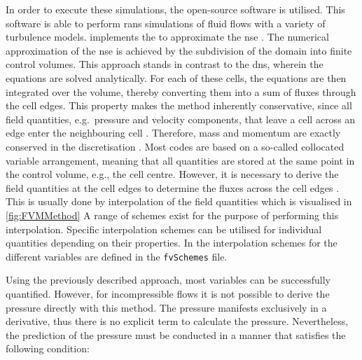In order to execute these simulations, the open-source software  is utilised. 
This software is able to perform \acrshort{rans} simulations of fluid flows with a variety of turbulence models. 
 implements the  to approximate the \acrshort{nse} \citep{weller_tensorial_1998}.
The numerical approximation of the \acrshort{nse} is achieved by the subdivision of the domain into finite control volumes. 
This approach stands in contrast to the \acrshort{dns}, wherein the equations are solved analytically.
For each of these cells, the equations are then integrated over the volume, thereby converting them into a sum of fluxes through the cell edges.
This property makes the method inherently conservative, since all field quantities, e.g.~pressure and velocity components, that leave a cell across an edge enter the neighbouring cell \citep{moukalled_finite_2016}. 
Therefore, mass and momentum are exactly conserved in the discretisation \citep{weller_tensorial_1998}.
Most codes are based on a so-called collocated variable arrangement, meaning that all quantities are stored at the same point in the control volume, e.g., the cell centre.
However, it is necessary to derive the field quantities at the cell edges to determine the fluxes across the cell edges \citep{schlatter_lecture_2025}.
This is usually done by interpolation of the field quantities which is visualised in \autoref{fig:FVMMethod}
A range of schemes exist for the purpose of performing this interpolation. 
Specific interpolation schemes can be utilised for individual quantities depending on their properties.
In  the interpolation schemes for the different variables are defined in the \texttt{fvSchemes} file.


Using the previously described approach, most variables can be successfully quantified.
However, for incompressible flows it is not possible to derive the pressure directly with this method.
The pressure manifests exclusively in a derivative, thus there is no explicit term to calculate the pressure.
Nevertheless, the prediction of the pressure must be conducted in a manner that satisfies the following condition:

